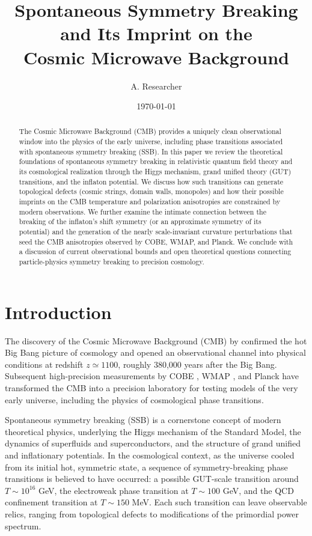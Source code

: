 \documentclass[11pt]{article}
\title{Spontaneous Symmetry Breaking and Its Imprint on the\\ Cosmic Microwave Background}
\author[1]{A. Researcher}
\affil[1]{Department of Physics and Astronomy}
\date{\today}
\begin{document}
\maketitle

\begin{abstract}
The Cosmic Microwave Background (CMB) provides a uniquely clean observational window into the physics of the early universe, including phase transitions associated with spontaneous symmetry breaking (SSB). In this paper we review the theoretical foundations of spontaneous symmetry breaking in relativistic quantum field theory and its cosmological realization through the Higgs mechanism, grand unified theory (GUT) transitions, and the inflaton potential. We discuss how such transitions can generate topological defects (cosmic strings, domain walls, monopoles) and how their possible imprints on the CMB temperature and polarization anisotropies are constrained by modern observations. We further examine the intimate connection between the breaking of the inflaton's shift symmetry (or an approximate symmetry of its potential) and the generation of the nearly scale-invariant curvature perturbations that seed the CMB anisotropies observed by COBE, WMAP, and Planck. We conclude with a discussion of current observational bounds and open theoretical questions connecting particle-physics symmetry breaking to precision cosmology.
\end{abstract}

\section{Introduction}

The discovery of the Cosmic Microwave Background (CMB) by \citet{Penzias1965} confirmed the hot Big Bang picture of cosmology and opened an observational channel into physical conditions at redshift $z \simeq 1100$, roughly 380{,}000 years after the Big Bang. Subsequent high-precision measurements by COBE \citep{Smoot1992}, WMAP \citep{Bennett2013}, and Planck \citep{Planck2018} have transformed the CMB into a precision laboratory for testing models of the very early universe, including the physics of cosmological phase transitions.

Spontaneous symmetry breaking (SSB) is a cornerstone concept of modern theoretical physics, underlying the Higgs mechanism of the Standard Model, the dynamics of superfluids and superconductors, and the structure of grand unified and inflationary potentials. In the cosmological context, as the universe cooled from its initial hot, symmetric state, a sequence of symmetry-breaking phase transitions is believed to have occurred: a possible GUT-scale transition around $T \sim 10^{16}$ GeV, the electroweak phase transition at $T \sim 100$ GeV, and the QCD confinement transition at $T \sim 150$ MeV. Each such transition can leave observable relics, ranging from topological defects to modifications of the primordial power spectrum.
\end{document}

